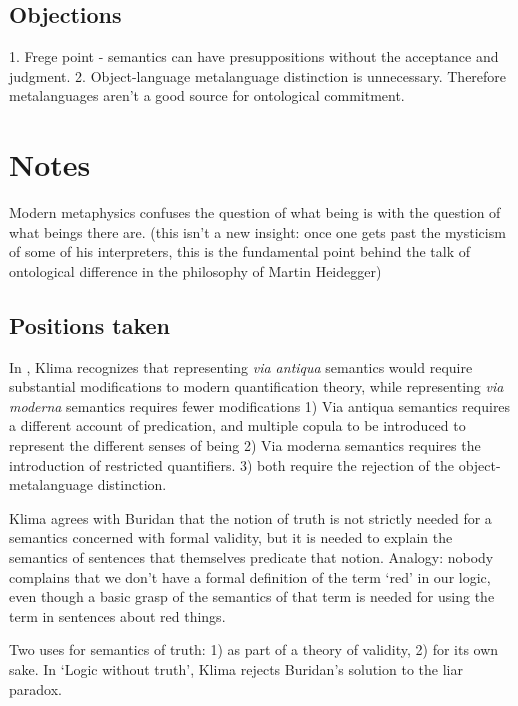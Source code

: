 \documentclass[]{article}
\begin{document}
\subsection{Objections}
1. Frege point - semantics can have presuppositions without the acceptance and judgment. 
2. Object-language metalanguage distinction is unnecessary. Therefore metalanguages aren't a good source for ontological commitment. 
\section{Notes}

Modern metaphysics confuses the question of what being is with the question of what beings there are. (this isn't a new insight: once one gets past the mysticism of some of his interpreters, this is the fundamental point behind the talk of ontological difference in the philosophy of Martin Heidegger)
\subsection{Positions taken}
In \autocite{Klima2008a}, Klima recognizes that representing \emph{via antiqua} semantics would require substantial modifications to modern quantification theory, while representing \emph{via moderna} semantics requires fewer modifications
1) Via antiqua semantics requires a different account of predication, and multiple copula to be introduced to represent the different senses of being
2) Via moderna semantics requires the introduction of restricted quantifiers.
3) both require the rejection of the object-metalanguage distinction.

Klima agrees with Buridan that the notion of truth is not strictly needed for a semantics concerned with formal validity, but it is needed to explain the semantics of sentences that themselves predicate that notion.
Analogy: nobody complains that we don't have a formal definition of the term `red' in our logic, even though a basic grasp of the semantics of that term is needed for using the term in sentences about red things.

Two uses for semantics of truth: 1) as part of a theory of validity, 2) for its own sake.
In `Logic without truth', Klima rejects Buridan's solution to the liar paradox.
\end{document}
